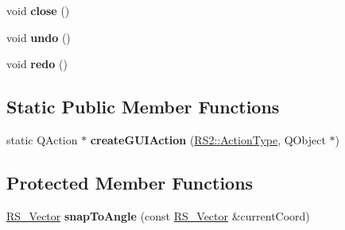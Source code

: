 \begin{DoxyCompactItemize}
\item 
\hypertarget{classRS__ActionDrawLine_a0aa1aa122e3b9356dfbca278f623534f}{void {\bfseries close} ()}\label{classRS__ActionDrawLine_a0aa1aa122e3b9356dfbca278f623534f}

\item 
\hypertarget{classRS__ActionDrawLine_a39edc20431669d130e9b5d86074e1830}{void {\bfseries undo} ()}\label{classRS__ActionDrawLine_a39edc20431669d130e9b5d86074e1830}

\item 
\hypertarget{classRS__ActionDrawLine_ab2f0cb3adb66dfd9b1fad451e79614f6}{void {\bfseries redo} ()}\label{classRS__ActionDrawLine_ab2f0cb3adb66dfd9b1fad451e79614f6}

\end{DoxyCompactItemize}
\subsection*{Static Public Member Functions}
\begin{DoxyCompactItemize}
\item 
\hypertarget{classRS__ActionDrawLine_a85184b8a8d4827b267867471105b1ea9}{static Q\-Action $\ast$ {\bfseries create\-G\-U\-I\-Action} (\hyperlink{classRS2_afe3523e0bc41fd637b892321cfc4b9d7}{R\-S2\-::\-Action\-Type}, Q\-Object $\ast$)}\label{classRS__ActionDrawLine_a85184b8a8d4827b267867471105b1ea9}

\end{DoxyCompactItemize}
\subsection*{Protected Member Functions}
\begin{DoxyCompactItemize}
\item 
\hypertarget{classRS__ActionDrawLine_a4bd9cbf4bcadfe2afb719b2a7aa26582}{\hyperlink{classRS__Vector}{R\-S\-\_\-\-Vector} {\bfseries snap\-To\-Angle} (const \hyperlink{classRS__Vector}{R\-S\-\_\-\-Vector} \&current\-Coord)}\label{classRS__ActionDrawLine_a4bd9cbf4bcadfe2afb719b2a7aa26582}

\end{DoxyCompactItemize}
